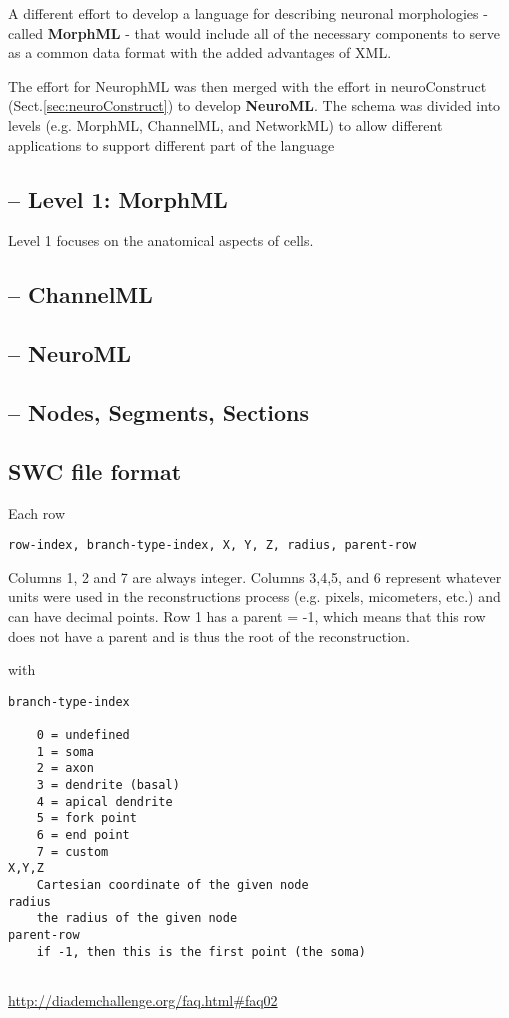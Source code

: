 A different effort to develop a language for describing neuronal morphologies -
called {\bf MorphML} - that would include all of the necessary components to
serve as a common data format with the added advantages of XML.

The effort for NeurophML was then merged with the effort in neuroConstruct
(Sect.\ref{sec:neuroConstruct}) to develop {\bf NeuroML}. The schema was divided
into levels (e.g. MorphML, ChannelML, and NetworkML) to allow different
applications to support different part of the language

\subsection{-- Level 1: MorphML}

Level 1 focuses on the anatomical aspects of cells.


\subsection{-- ChannelML}


\subsection{-- NeuroML}

\subsection{-- Nodes, Segments, Sections}




\subsection{SWC file format}
\label{sec:SWC-format}

Each row
\begin{verbatim}
row-index, branch-type-index, X, Y, Z, radius, parent-row
\end{verbatim}
Columns 1, 2 and 7 are always integer. Columns 3,4,5, and 6 represent whatever
units were used in the reconstructions process (e.g. pixels, micometers, etc.) and can have decimal points.
Row 1 has a parent = -1, which means that this row does not have a parent and is
thus the root of the reconstruction.


with 
\begin{verbatim}
branch-type-index 
    
    0 = undefined
    1 = soma
    2 = axon
    3 = dendrite (basal)
    4 = apical dendrite
    5 = fork point
    6 = end point
    7 = custom
X,Y,Z
    Cartesian coordinate of the given node
radius
    the radius of the given node    
parent-row
    if -1, then this is the first point (the soma)
    
\end{verbatim}
\url{http://diademchallenge.org/faq.html#faq02}

